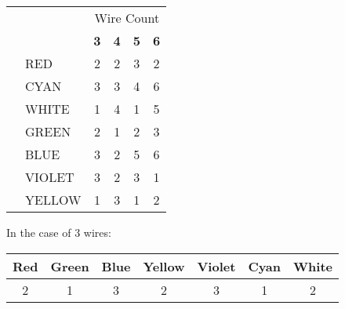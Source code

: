 \documentclass[letterpaper,12pt]{report}
\begin{document}
\begin{center}
  \begin{tabular}{|c|l|c|c|c|c|}
    \cline{3-6} \multicolumn{2}{c|}{}                                          & \multicolumn{4}{c|}{Wire Count}                                            \\
    \cline{3-6} \multicolumn{2}{c|}{}                                          & \textbf{3}                      & \textbf{4} & \textbf{5} & \textbf{6}     \\\hline
    \parbox[t]{5mm}{} & RED                             & 2          & 2          & 3          & 2 \\
                                                                    & CYAN                            & 3          & 3          & 4          & 6 \\
                                                                    & WHITE                           & 1          & 4          & 1          & 5 \\
                                                                    & GREEN                           & 2          & 1          & 2          & 3 \\
                                                                    & BLUE                            & 3          & 2          & 5          & 6 \\
                                                                    & VIOLET                          & 3          & 2          & 3          & 1 \\
                                                                    & YELLOW                          & 1          & 3          & 1          & 2 \\
    \hline
  \end{tabular}
\end{center}
\vspace{1cm}

\begin{center}
  \noindent
  In the case of 3 wires:\vspace{2mm}
  \begin{tabular}{|c|c|c|c|c|c|c|}
    \hline
    Red & Green & Blue & Yellow & Violet & Cyan & White \\\hline
    2   & 1     & 3    & 2      & 3      & 1    & 2     \\
    \hline
  \end{tabular}
\end{center}
\end{document}
